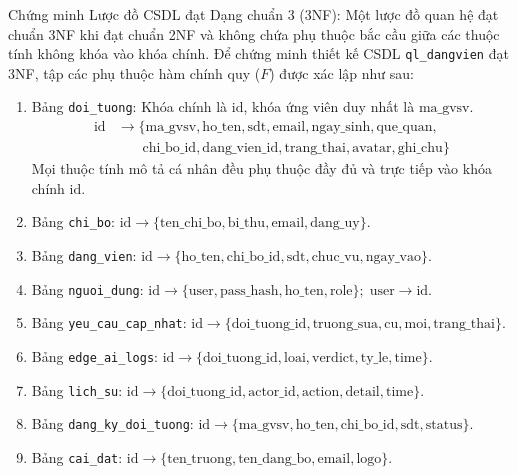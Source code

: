 \documentclass[12pt,a4paper]{report}
\begin{document}
Chứng minh Lược đồ CSDL đạt Dạng chuẩn 3 (3NF):
Một lược đồ quan hệ đạt chuẩn 3NF khi đạt chuẩn 2NF và không chứa phụ thuộc bắc cầu giữa các thuộc tính không khóa vào khóa chính. Để chứng minh thiết kế CSDL \texttt{ql\_dangvien} đạt 3NF, tập các phụ thuộc hàm chính quy ($F$) được xác lập như sau:
\begin{enumerate}[label=\arabic*.]
  \item Bảng \texttt{doi\_tuong}: Khóa chính là $\text{id}$, khóa ứng viên duy nhất là $\text{ma\_gvsv}$.
        \begin{equation}
          \begin{aligned}
            \text{id} & \to \{\text{ma\_gvsv}, \text{ho\_ten}, \text{sdt}, \text{email}, \text{ngay\_sinh}, \text{que\_quan},       \\
                      & \quad\;\;\; \text{chi\_bo\_id}, \text{dang\_vien\_id}, \text{trang\_thai}, \text{avatar}, \text{ghi\_chu}\}
          \end{aligned}
        \end{equation}
        Mọi thuộc tính mô tả cá nhân đều phụ thuộc đầy đủ và trực tiếp vào khóa chính $\text{id}$.
  \item Bảng \texttt{chi\_bo}: $\text{id} \to \{\text{ten\_chi\_bo}, \text{bi\_thu}, \text{email}, \text{dang\_uy}\}$.
  \item Bảng \texttt{dang\_vien}: $\text{id} \to \{\text{ho\_ten}, \text{chi\_bo\_id}, \text{sdt}, \text{chuc\_vu}, \text{ngay\_vao}\}$.
  \item Bảng \texttt{nguoi\_dung}: $\text{id} \to \{\text{user}, \text{pass\_hash}, \text{ho\_ten}, \text{role}\}; \; \text{user} \to \text{id}$.
  \item Bảng \texttt{yeu\_cau\_cap\_nhat}: $\text{id} \to \{\text{doi\_tuong\_id}, \text{truong\_sua}, \text{cu}, \text{moi}, \text{trang\_thai}\}$.
  \item Bảng \texttt{edge\_ai\_logs}: $\text{id} \to \{\text{doi\_tuong\_id}, \text{loai}, \text{verdict}, \text{ty\_le}, \text{time}\}$.
  \item Bảng \texttt{lich\_su}: $\text{id} \to \{\text{doi\_tuong\_id}, \text{actor\_id}, \text{action}, \text{detail}, \text{time}\}$.
  \item Bảng \texttt{dang\_ky\_doi\_tuong}: $\text{id} \to \{\text{ma\_gvsv}, \text{ho\_ten}, \text{chi\_bo\_id}, \text{sdt}, \text{status}\}$.
  \item Bảng \texttt{cai\_dat}: $\text{id} \to \{\text{ten\_truong}, \text{ten\_dang\_bo}, \text{email}, \text{logo}\}$.
\end{enumerate}
\end{document}
